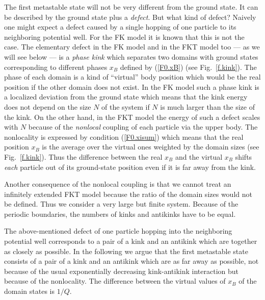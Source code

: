 The first metastable state will not be very different from the ground
state. It can be described by the ground state plus a {\em defect\/}.
But what kind of defect?  Naively one might expect a defect caused by
a single hopping of one particle to its neighboring potential well.
For the FK model it is known that this is not the case\cite{val.88}.
The elementary defect in the FK model and in the FKT model too --- as
we will see below --- is a {\em phase kink\/} which separates two
domains with ground states corresponding to different phases $x_B$
defined by (\ref{F0.xB}) (see Fig.~\ref{f.kink}). The phase of each
domain is a kind of ``virtual'' body position which would be the real
position if the other domain does not exist.  In the FK model such a
phase kink is a localized deviation from the ground state which means
that the kink energy does not depend on the size $N$ of the system if
$N$ is much larger than the size of the kink.  On the other hand, in
the FKT model the energy of such a defect scales with $N$ because of
the {\em nonlocal\/} coupling of each particle via the upper body.
The nonlocality is expressed by condition (\ref{F0.xisum}) which
means that the real position $x_B$ is the average over the virtual
ones weighted by the domain sizes (see Fig.~\ref{f.kink}). Thus the
difference between the real $x_B$ and the virtual $x_B$ shifts {\em
each\/} particle out of its ground-state position even if it is far
away from the kink.

Another consequence of the nonlocal coupling is that we cannot treat
an infinitely extended FKT model because the ratio of the domain
sizes would not be defined. Thus we consider a very large but finite
system. Because of the periodic boundaries, the numbers of kinks and 
antikinks have to be equal.

The above-mentioned defect of one particle hopping into the
neighboring potential well corresponds to a pair of a kink and an
antikink which are together as closely as possible. In the following
we argue that the first metastable state consists of a pair of a kink
and an antikink which are as far away as possible, not because of the
usual exponentially decreasing kink-antikink interaction but because
of the nonlocality. The difference between the virtual values of
$x_B$ of the domain states is $1/Q$.

